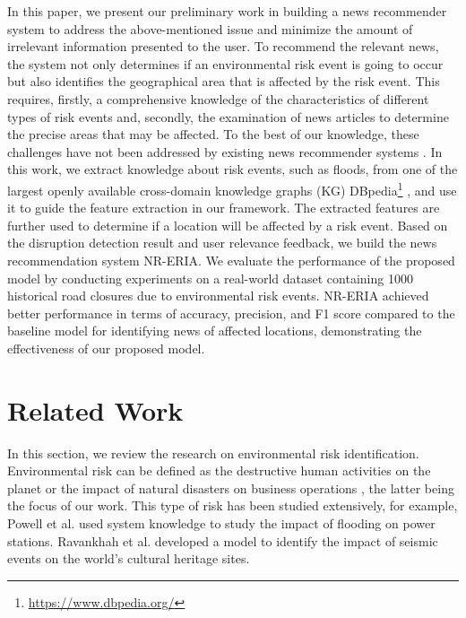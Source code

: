 \documentclass[]{ceurart}
\begin{document}
In this paper, we present our preliminary work in building a news recommender system to address the above-mentioned issue and minimize the amount of irrelevant information presented to the user. 
To recommend the relevant news, the system not only determines if an environmental risk event is going to occur but also identifies the geographical area that is affected by the risk event.
This requires, firstly, a comprehensive knowledge of the characteristics of different types of risk events and, secondly, the examination of news articles to determine the precise areas that may be affected. To the best of our knowledge, these challenges have not been addressed by existing news recommender systems \cite{raza2022news}. In this work, we extract knowledge about risk events, such as floods, from one of the largest openly available cross-domain knowledge graphs (KG) DBpedia\footnote{\url{https://www.dbpedia.org/}} \cite{articledbpedia}, and use it to guide the feature extraction in our framework. The extracted features are further used to determine if a location will be affected by a risk event. 
Based on the disruption detection result and user relevance feedback, we build the news recommendation system NR-ERIA.
We evaluate the performance of the proposed model by conducting experiments on a real-world dataset containing 1000 historical road closures due to environmental risk events. NR-ERIA achieved better performance in terms of accuracy, precision, and F1 score compared to the baseline model for identifying news of affected locations, demonstrating the effectiveness of our proposed model. 


\section{Related Work}\label{sec:related_works}
In this section, we review the research on environmental risk identification. Environmental risk can be defined as the destructive human activities on the planet \cite{jones2001environmental} or the impact of natural disasters on business operations \cite{coburn2013taxonomy}, the latter being the focus of our work. This type of risk has been studied extensively, for example, Powell et al. \cite{powell2016system} used system knowledge to study the impact of flooding on power stations. Ravankhah et al. \cite{ravankhah2017multi} developed a model to identify the impact of seismic events on the world's cultural heritage sites.
\end{document}
